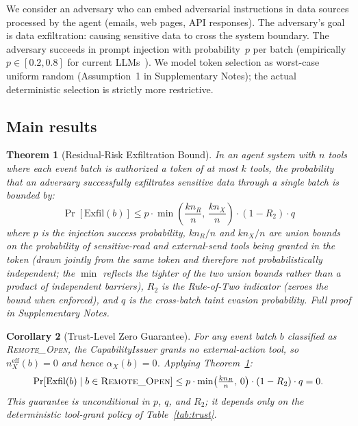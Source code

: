 \documentclass[pdflatex,sn-nature]{sn-jnl}%
\theoremstyle{thmstyleone}%
\newtheorem{theorem}{Theorem}%
\newtheorem{corollary}[theorem]{Corollary}%
\theoremstyle{thmstyletwo}%
\theoremstyle{thmstylethree}%
\begin{document}
We consider an adversary who can embed adversarial instructions in data sources processed by the agent (emails, web pages, API responses). The adversary's goal is data exfiltration: causing sensitive data to cross the system boundary. The adversary succeeds in prompt injection with probability~$p$ per batch (empirically $p \in [0.2, 0.8]$ for current LLMs~\cite{zhan2024injecagent,yi2023benchmarking}). We model token selection as worst-case uniform random (Assumption~1 in Supplementary Notes); the actual deterministic selection is strictly more restrictive.

\subsection{Main results}\label{subsec:results}

\begin{theorem}[Residual-Risk Exfiltration Bound]\label{thm:main}
In an agent system with $n$ tools where each event batch is authorized a token of at most $k$ tools, the probability that an adversary successfully exfiltrates sensitive data through a single batch is bounded by:
\begin{equation}\label{eq:main}
  \Pr[\text{Exfil}(b)] \leq p \cdot \min\!\left(\frac{kn_R}{n},\, \frac{kn_X}{n}\right) \cdot (1 - R_2) \cdot q
\end{equation}
where $p$ is the injection success probability, $kn_R/n$ and $kn_X/n$ are union bounds on the probability of sensitive-read and external-send tools being granted in the token (drawn jointly from the same token and therefore not probabilistically independent; the $\min$ reflects the tighter of the two union bounds rather than a product of independent barriers), $R_2$ is the Rule-of-Two indicator (zeroes the bound when enforced), and $q$ is the cross-batch taint evasion probability. Full proof in Supplementary Notes.
\end{theorem}

\begin{corollary}[Trust-Level Zero Guarantee]\label{cor:trust-zero}
For any event batch $b$ classified as \textsc{Remote\_Open}, the CapabilityIssuer grants no external-action tool, so $n_X^{\text{eff}}(b) = 0$ and hence $\alpha_X(b) = 0$. Applying Theorem~\ref{thm:main}:
\begin{equation}
  \Pr[\text{Exfil}(b) \mid b \in \textsc{Remote\_Open}] \leq p \cdot \min\!\left(\tfrac{kn_R}{n},\, 0\right) \cdot (1-R_2) \cdot q = 0.
\end{equation}
This guarantee is unconditional in $p$, $q$, and $R_2$; it depends only on the deterministic tool-grant policy of Table~\ref{tab:trust}.
\end{corollary}
\end{document}
